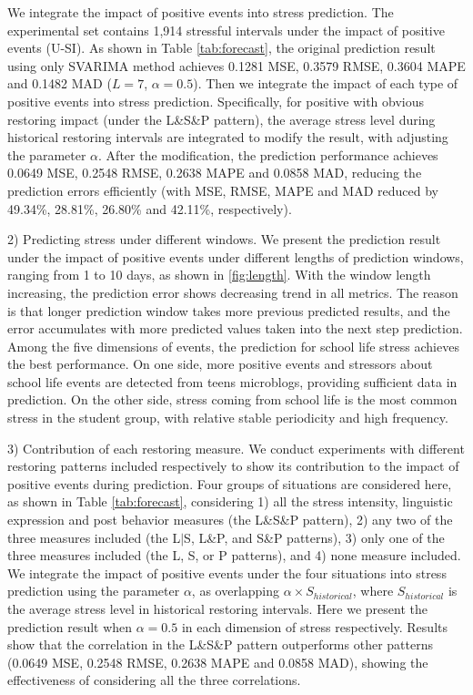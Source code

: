 We integrate the impact of positive events into stress prediction.
The experimental set contains 1,914 stressful intervals under the impact of positive events (U-SI).
As shown in Table \ref{tab:forecast},
the original prediction result using only SVARIMA method
achieves 0.1281 MSE, 0.3579 RMSE, 0.3604 MAPE and 0.1482 MAD ($L = 7$, $\alpha = 0.5$).
Then we integrate the impact of each type of positive events into stress prediction.
Specifically, for positive with obvious restoring impact (under the L\&S\&P pattern),
the average stress level during historical restoring intervals are integrated to modify the result,
with adjusting the parameter $\alpha$.
After the modification,
the prediction performance achieves 0.0649 MSE,	0.2548 RMSE, 0.2638 MAPE and 0.0858 MAD,
reducing the prediction errors efficiently (with MSE, RMSE, MAPE and MAD reduced by 49.34\%, 28.81\%, 26.80\% and 42.11\%, respectively).

2) Predicting stress under different windows.
We present the prediction result under the impact of positive events under different lengths of prediction windows,
ranging from 1 to 10 days, as shown in \ref{fig:length}.
With the window length increasing,
the prediction error shows decreasing trend in all metrics.
The reason is that longer prediction window takes more previous predicted results,
and the error accumulates with more predicted values taken into the next step prediction.
Among the five dimensions of events,
the prediction for school life stress achieves the best performance.
On one side,
more positive events and stressors about school life events are detected from teens microblogs,
providing sufficient data in prediction.
On the other side,
stress coming from school life is the most common stress in the student group,
with relative stable periodicity and high frequency.

3) Contribution of each restoring measure.
We conduct experiments with different restoring patterns included respectively to show
its contribution to the impact of positive events during prediction.
Four groups of situations are considered here, as shown in Table \ref{tab:forecast},
considering
1) all the stress intensity, linguistic expression and post behavior measures (the L\&S\&P pattern),
2) any two of the three measures included (the L$|$S, L\&P, and S\&P patterns),
3) only one of the three measures included (the L, S, or P patterns),
and 4) none measure included.
We integrate the impact of positive events under the four situations into stress prediction
using the parameter $\alpha$,
as overlapping $\alpha \times S_{historical}$,
where $S_{historical}$ is the average stress level in historical restoring intervals.
Here we present the prediction result when $\alpha = 0.5$ in each dimension of stress respectively.
Results show that the correlation in the L\&S\&P pattern outperforms other patterns
(0.0649 MSE, 0.2548 RMSE, 0.2638 MAPE and 0.0858 MAD),
showing the effectiveness of considering all the three correlations.

